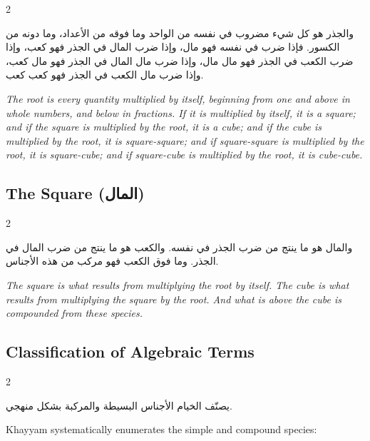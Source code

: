\documentclass[11pt,a4paper]{book}
\begin{document}
\begin{paracol}{2}

\begin{Arabic}
والجذر هو كل شيء مضروب في نفسه من الواحد وما فوقه من الأعداد، وما دونه من الكسور. فإذا ضرب في نفسه فهو مال، وإذا ضرب المال في الجذر فهو كعب، وإذا ضرب الكعب في الجذر فهو مال مال، وإذا ضرب مال المال في الجذر فهو مال كعب، وإذا ضرب مال الكعب في الجذر فهو كعب كعب.
\end{Arabic}

\switchcolumn

\textit{The root is every quantity multiplied by itself, beginning from one and above in whole numbers, and below in fractions. If it is multiplied by itself, it is a square; and if the square is multiplied by the root, it is a cube; and if the cube is multiplied by the root, it is square-square; and if square-square is multiplied by the root, it is square-cube; and if square-cube is multiplied by the root, it is cube-cube.}

\end{paracol}

\subsection{The Square (\textarabic{المال})}
\label{subsec:square}

\begin{paracol}{2}

\begin{Arabic}
والمال هو ما ينتج من ضرب الجذر في نفسه. والكعب هو ما ينتج من ضرب المال في الجذر. وما فوق الكعب فهو مركب من هذه الأجناس.
\end{Arabic}

\switchcolumn

\textit{The square is what results from multiplying the root by itself. The cube is what results from multiplying the square by the root. And what is above the cube is compounded from these species.}

\end{paracol}

\subsection{Classification of Algebraic Terms}
\label{subsec:terms}

\begin{paracol}{2}

\begin{Arabic}
يصنّف الخيام الأجناس البسيطة والمركبة بشكل منهجي.
\end{Arabic}

\switchcolumn

Khayyam systematically enumerates the simple and compound species:

\end{paracol}
\end{document}
